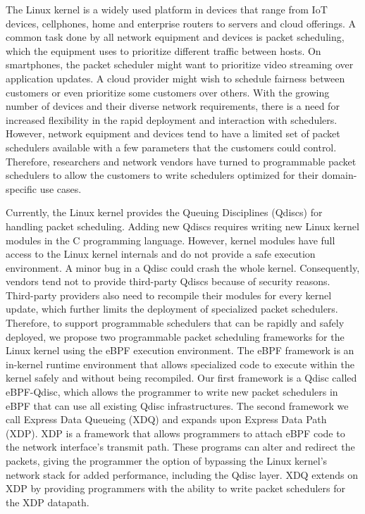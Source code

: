 \documentclass[sigconf, nonacm]{acmart}
\begin{document}
The Linux kernel is a widely used platform in devices that range from IoT
devices, cellphones, home and enterprise routers to servers and cloud offerings.
A common task done by all network equipment and devices is packet scheduling,
which the equipment uses to prioritize different traffic between hosts. On
smartphones, the packet scheduler might want to prioritize video streaming over
application updates. A cloud provider might wish to schedule fairness between
customers or even prioritize some customers over others. With the growing number
of devices and their diverse network requirements, there is a need for increased
flexibility in the rapid deployment and interaction with schedulers. However,
network equipment and devices tend to have a limited set of packet schedulers
available with a few parameters that the customers could control. Therefore,
researchers and network vendors have turned to programmable packet schedulers
to allow the customers to write schedulers optimized for their domain-specific
use cases.

Currently, the Linux kernel provides the Queuing Disciplines (Qdiscs) for
handling packet scheduling. Adding new Qdiscs requires writing new Linux kernel
modules in the C programming language. However, kernel modules have full access
to the Linux kernel internals and do not provide a safe execution environment. A
minor bug in a Qdisc could crash the whole kernel. Consequently, vendors tend
not to provide third-party Qdiscs because of security reasons. Third-party
providers also need to recompile their modules for every kernel update, which
further limits the deployment of specialized packet schedulers. Therefore, to
support programmable schedulers that can be rapidly and safely deployed, we
propose two programmable packet scheduling frameworks for the Linux kernel using
the eBPF execution environment. The eBPF framework is an in-kernel runtime
environment that allows specialized code to execute within the kernel safely and
without being recompiled. Our first framework is a Qdisc called eBPF-Qdisc,
which allows the programmer to write new packet schedulers in eBPF that can use
all existing Qdisc infrastructures. The second framework we call Express Data
Queueing (XDQ) and expands upon Express Data Path
(XDP)\cite{hoiland2018express}. XDP is a framework that allows programmers to
attach eBPF code to the network interface's transmit path. These programs can
alter and redirect the packets, giving the programmer the option of bypassing
the Linux kernel's network stack for added performance, including the Qdisc
layer. XDQ extends on XDP by providing programmers with the ability to write
packet schedulers for the XDP datapath.
\end{document}
